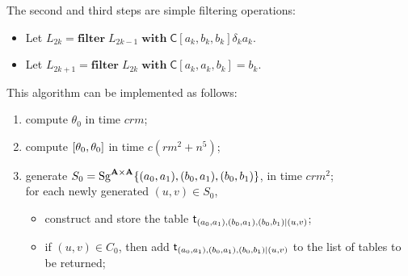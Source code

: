   The second and third steps are simple filtering operations:
  \begin{itemize}
    \item Let $L_{2k} = \mathbf{filter}\; L_{2k-1} \; \mathbf{with} \; \mathsf{C}[a_k, b_k, b_k] \mathrel{\delta_{k}} a_k$.
    \item Let $L_{2k+1} = \mathbf{filter} \; L_{2k} \; \mathbf{with} \; \mathsf{C}[a_k, a_k, b_k] = b_k$.
  \end{itemize}
  
  This algorithm can be implemented as follows:
   \begin{enumerate}
  \item compute $\theta_0$ in time $crm$;
  \item compute $[ \theta_0 ,  \theta_0 ]$ in time $c(rm^2 + n^5)$;
  \item generate $S_0=\operatorname{Sg}^{\mathbf{A}\times \mathbf{A}} \{(a_0,a_1),(b_0,a_1),(b_0,b_1)\}$,
    in time $c r m^2$;\\
  for each newly generated $(u,v) \in S_0$, 
    \begin{itemize}
    \item construct and store the table
      $\mathsf{t}_{(a_0,a_1),(b_0,a_1),(b_0,b_1)|(u,v)}$;
    \item if $(u,v) \in C_0$, then add $\mathsf{t}_{(a_0,a_1),(b_0,a_1),(b_0,b_1)|(u,v)}$
     to the list of tables to be returned; 
    \end{itemize}
  \end{enumerate}
  
  
  
  
  \begin{comment}
  \noindent \underline{\textbf{Subroutine \ld-2'}}\\[4pt]
  To compute a \ldto for
  $((a_0,b_0,1), (a_1, b_1, 0))$, obviously this is symmetric to
  the situation handled in Subroutine LD2 and so the general algorithm
  is the same.  Nonetheless, we include a listing of the computational
  steps required so that later we can easily refer to this special case
  of the general algorithm.
  \begin{enumerate}[{\bf 1}]
  \item Compute $\delta_1=\com{\thetaone}$;
  \item form $C_1= \{b_0\}\times a_1/\delta_1 \leq \alg{A}\times\alg{A}$;
  \item compute
        $S_1=\Sg^{\alg{A}\times \alg{A}} ((a_0,a_1),(a_0,b_1),(b_0,b_1))$;
  \item find a term operation $t$ of $\alg{A}$ satisfying
  \[t^{\alg{A}\times\alg{A}}((a_0,a_1),(a_0,b_1),(b_0,b_1)) =
   (t^{\alg{A}}(a_0,a_0,b_0), t^{\alg{A}}(a_1,b_1,b_1)) \in C_1 \cap S_1.\]
  \end{enumerate}
  Then $t$ is a \ldto for
  $((a_0, b_0, 1), (a_1, b_1, 0))$.
  \end{comment}
  
